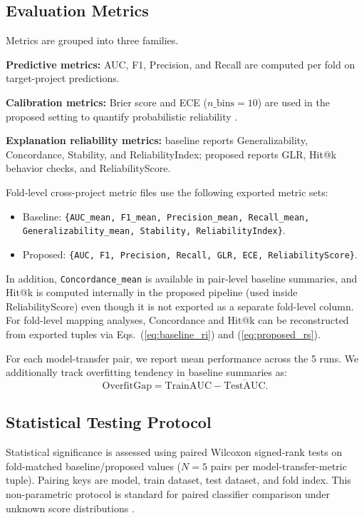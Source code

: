 \documentclass[conference]{IEEEtran}
\begin{document}
\subsection{Evaluation Metrics}
Metrics are grouped into three families.

\textbf{Predictive metrics:} AUC, F1, Precision, and Recall are computed per fold on target-project predictions.

\textbf{Calibration metrics:} Brier score and ECE (\(n\_\text{bins}=10\)) are used in the proposed setting to quantify probabilistic reliability \cite{r12,r13,r14}.

\textbf{Explanation reliability metrics:} baseline reports Generalizability, Concordance, Stability, and ReliabilityIndex; proposed reports GLR, Hit@k behavior checks, and ReliabilityScore.

Fold-level cross-project metric files use the following exported metric sets:
\begin{itemize}
\item Baseline: \texttt{\{AUC\_mean, F1\_mean, Precision\_mean, Recall\_mean, Generalizability\_mean, Stability, ReliabilityIndex\}}.
\item Proposed: \texttt{\{AUC, F1, Precision, Recall, GLR, ECE, ReliabilityScore\}}.
\end{itemize}

In addition, \texttt{Concordance\_mean} is available in pair-level baseline summaries, and Hit@k is computed internally in the proposed pipeline (used inside ReliabilityScore) even though it is not exported as a separate fold-level column. For fold-level mapping analyses, Concordance and Hit@k can be reconstructed from exported tuples via Eqs.~(\ref{eq:baseline_ri}) and (\ref{eq:proposed_rs}).

For each model-transfer pair, we report mean performance across the 5 runs. We additionally track overfitting tendency in baseline summaries as:
\begin{equation}
\text{OverfitGap}=\overline{\text{TrainAUC}}-\overline{\text{TestAUC}}.
\end{equation}

\subsection{Statistical Testing Protocol}
Statistical significance is assessed using paired Wilcoxon signed-rank tests on fold-matched baseline/proposed values (\(N=5\) pairs per model-transfer-metric tuple). Pairing keys are model, train dataset, test dataset, and fold index. This non-parametric protocol is standard for paired classifier comparison under unknown score distributions \cite{r15}.
\end{document}
